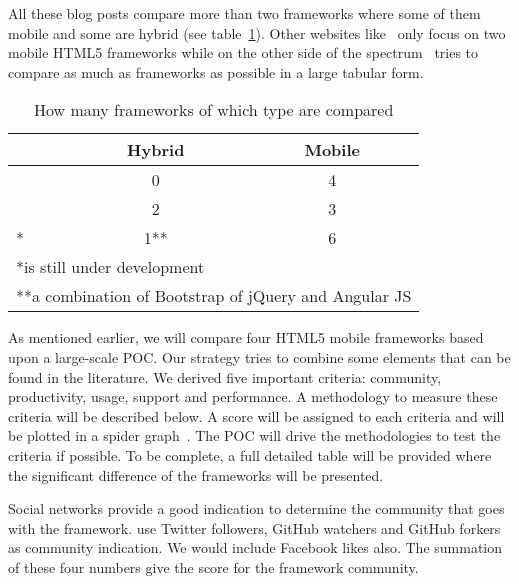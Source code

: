 \documentclass[a4paper]{artikel3}
\renewcommand{\paragraph}[1]{\vspace{2mm} \noindent {\bf #1}  }
\begin{document}
All these blog posts compare more than two frameworks where some of them mobile and some are hybrid (see table~\ref{table:references_frameworks}).  Other websites like~\cite{Bristowe2012,Burris} only focus on two mobile HTML5 frameworks while on the other side of the spectrum~\cite{Falk2011} tries to compare as much as frameworks as possible in a large tabular form.


\begin{table}[h!]
\centering
\begin{tabular}{lcc}
  & \textbf{Hybrid} & \textbf{Mobile}\\
  \hline \hline
\cite{Sarrafi2012a} & 0 & 4\\
\cite{Rozynski2011} & 2 & 3\\
\cite{Ayuso2012}* & 1** & 6\\
\hline
\multicolumn{3}{l}{*is still under development} \\
\multicolumn{3}{l}{**a combination of Bootstrap of jQuery and Angular JS} \\
\end{tabular}
\caption{How many frameworks of which type are compared}
\label{table:references_frameworks}
\end{table}

As mentioned earlier,  we will compare four HTML5 mobile frameworks based upon a large-scale POC.  Our strategy tries to combine some elements that can be found in the literature.  We derived five important criteria:  community,  productivity,  usage,  support and performance.  A methodology to measure these criteria will be described below.  A score will be assigned to each criteria and will be plotted in a spider graph~\cite{Few2005}.   The POC will drive the methodologies to test the criteria if possible.  To be complete,  a full detailed table will be provided where the significant difference of the frameworks will be presented. 	


\paragraph{Community}%
Social networks provide a good indication to determine the community that goes with the framework.  \cite{Sarrafi2012a,Ayuso2012} use Twitter followers,  GitHub watchers and GitHub forkers as community indication.  We would include Facebook likes also.  The summation of these four numbers give the score for the framework community.  

\end{document}

